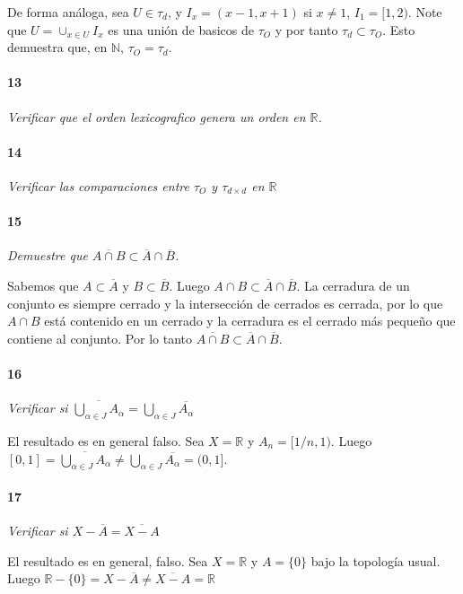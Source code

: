 \documentclass[12pt]{article}
\begin{document}
De forma análoga, sea $U \in \tau_d$, y $I_x=(x-1,x+1)$ si $x \neq 1$, $I_1=[1,2)$. Note que $U=\cup_{x\in U} I_x$ es una unión de 
basicos de $\tau_O$ y por tanto $\tau_d \subset \tau_O$. Esto demuestra que, en $\mathbb{N}$, $\tau_O =\tau_d$.

\paragraph{13}
\textit{Verificar que el orden lexicografico genera un orden en $\mathbb{R}$.}

\paragraph{14}
\textit{Verificar las comparaciones entre $\tau_O$ y $\tau_{d\times d}$ en $\mathbb{R}$}

\paragraph{15}
\textit{Demuestre que $\overline{A \cap B} \subset \overline{A} \cap \overline{B}$.}

Sabemos que $A \subset \overline{A}$ y $B \subset \overline{B}$. Luego $A \cap B \subset \overline{A} \cap \overline{B}$. La cerradura de un conjunto es siempre
cerrado y la intersección de cerrados es cerrada, por lo que $A \cap B$ está contenido en un cerrado y la cerradura es el cerrado más pequeño que contiene al conjunto. Por lo tanto
$\overline{A \cap B} \subset \overline{A} \cap \overline{B}$.

\paragraph{16}
\textit{Verificar si $\overline{\bigcup\limits_{\alpha\in J}A_{\alpha}}=\bigcup\limits_{\alpha\in J}\overline{A_{\alpha}}$}

El resultado es en general falso. Sea $X=\mathbb{R}$ y $A_n=[1/n,1)$.
Luego $[0,1]=\overline{\bigcup\limits_{\alpha\in J}A_{\alpha}} \neq \bigcup\limits_{\alpha\in J}\overline{A_{\alpha}} =(0,1]$.
\paragraph{17}
\textit{Verificar si $X-\overline{A}=\overline{X-A}$}

El resultado es en general, falso. Sea $X=\mathbb{R}$ y $A=\{0\}$ bajo la topología usual.
 Luego $\mathbb{R}-\{0\} = X-\overline{A}\neq \overline{X-A} = \mathbb{R}$
\end{document}
